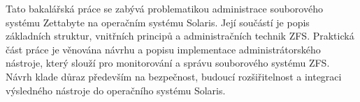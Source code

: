 Tato bakalářská práce se zabývá problematikou administrace souborového systému Zettabyte na operačním systému Solaris. Její součástí je popis základních struktur, vnitřních principů a administračních technik ZFS. Praktická část práce je věnována návrhu a popisu implementace administrátorského nástroje, který slouží pro monitorování a správu souborového systému ZFS. Návrh klade důraz především na bezpečnost, budoucí rozšiřitelnost a integraci výsledného nástroje do operačního systému Solaris. 